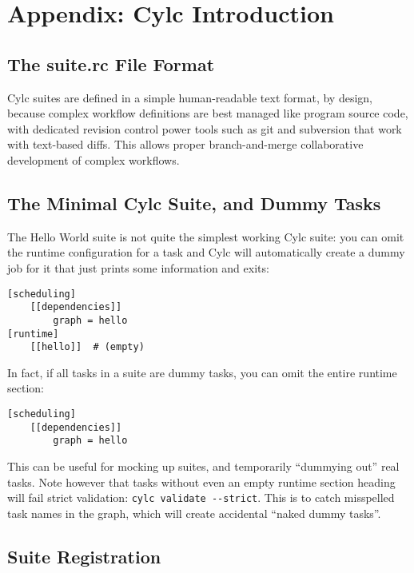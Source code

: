 \section{Appendix: Cylc Introduction}
\label{Appendix Cylc Introduction}


\subsection{The suite.rc File Format}

Cylc suites are defined in a simple human-readable text format, by design,
because complex workflow definitions are best managed like program source code,
with dedicated revision control power tools such as git and subversion that
work with text-based diffs.  This allows proper branch-and-merge collaborative
development of complex workflows.

\subsection{The Minimal Cylc Suite, and Dummy Tasks}

The Hello World suite is not quite the simplest working Cylc suite: you can
omit the runtime configuration for a task and Cylc will automatically create a
dummy job for it that just prints some information and exits:

\begin{lstlisting}[language=suiterc]
[scheduling]
    [[dependencies]]
        graph = hello
[runtime]
    [[hello]]  # (empty)
\end{lstlisting}

In fact, if all tasks in a suite are dummy tasks, you can omit the entire
runtime section:
\begin{lstlisting}[language=suiterc]
[scheduling]
    [[dependencies]]
        graph = hello
\end{lstlisting}

This can be useful for mocking up suites, and temporarily ``dummying out'' real
tasks.  Note however that tasks without even an empty runtime section heading
will fail strict validation: \lstinline=cylc validate --strict=.  This is to
catch misspelled task names in the graph, which will create accidental ``naked
dummy tasks''.

\subsection{Suite Registration}

